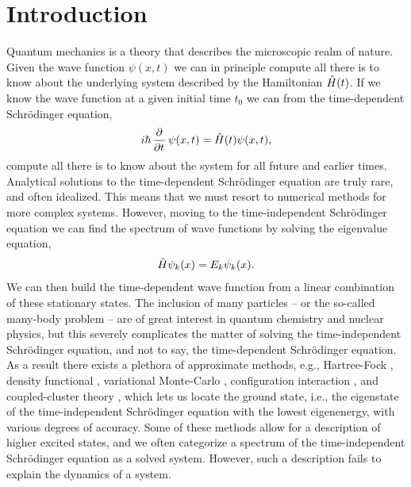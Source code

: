 \chapter{Introduction}
    Quantum mechanics is a theory that describes the microscopic realm of
    nature.
    Given the wave function $\psi(x, t)$ we can in principle compute all there
    is to know about the underlying system described by the Hamiltonian
    $\hat{H}(t)$.
    If we know the wave function at a given initial time $t_0$ we can from the
    time-dependent Schrödinger equation,
    \begin{align}
        i\hslash\dpd{}{t}\psi(x, t) = \hamil(t)\psi(x, t),
    \end{align}
    compute all there is to know about the system for all future and earlier
    times.
    Analytical solutions to the time-dependent Schrödinger equation are truly
    rare, and often idealized.
    This means that we must resort to numerical methods for more complex
    systems.
    However, moving to the time-independent Schrödinger equation we can find the
    spectrum of wave functions by solving the eigenvalue equation,
    \begin{align}
        \hat{H}\psi_k(x) = E_k\psi_k(x).
    \end{align}
    We can then build the time-dependent wave function from a linear combination
    of these stationary states.
    The inclusion of many particles -- or the so-called many-body problem -- are
    of great interest in quantum chemistry and nuclear physics, but this
    severely complicates the matter of solving the time-independent Schrödinger
    equation, and not to say, the time-dependent Schrödinger equation.
    As a result there exists a plethora of approximate methods, e.g.,
    Hartree-Fock \cite{hartree_1928, szabo1996modern}, density functional
    \cite{ullrich2011time}, variational Monte-Carlo \cite{hjorth2017advanced},
    configuration interaction \cite{helgaker-molecular}, and coupled-cluster
    theory \cite{coester1958421}, which lets us locate the ground state, i.e.,
    the eigenstate of the time-independent Schrödinger equation with the lowest
    eigenenergy, with various degrees of accuracy.
    Some of these methods allow for a description of higher excited states, and
    we often categorize a spectrum of the time-independent Schrödinger equation
    as a solved system.
    However, such a description fails to explain the dynamics of a system.

